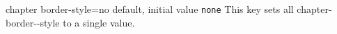 \begin{docKey}[phd]{chapter border-style}{=}{no default, initial value \texttt{none}}
This key sets all chapter-border--style to a single value.
\end{docKey}
%

